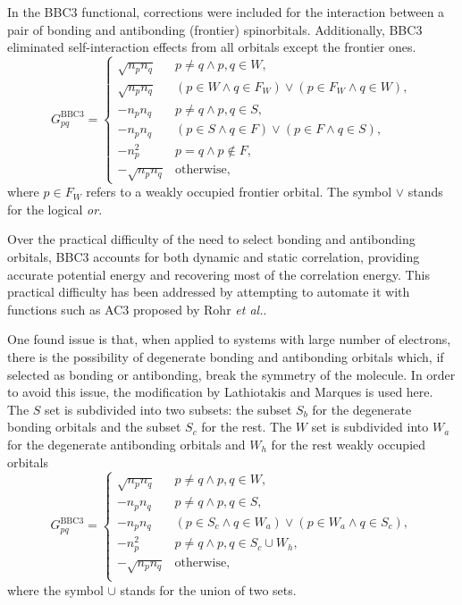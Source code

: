 In the BBC3 functional, corrections were included for the interaction between a pair 
of bonding and antibonding (frontier) spinorbitals.
Additionally, BBC3 eliminated self-interaction effects from all orbitals except
the frontier ones.
\begin{equation}
    G_{pq}^{\text{BBC3}} =
    \begin{cases}
        \sqrt{n_p n_q} &
        p\not=q \wedge p,q \in W,
        \\
        \sqrt{n_p n_q} &
        \left( p \in W \wedge q \in F_W \right) \vee
        \left( p \in F_W \wedge q \in W \right),
        \\
        -n_p n_q &
        p\not=q \wedge p,q \in S,
        \\
        -n_p n_q &
        \left( p \in S \wedge q \in F \right) \vee
        \left( p \in F \wedge q \in S \right),
        \\
        -n_p^{2} & p=q \wedge p\not\in F, \\
        - \sqrt{n_p n_q} & \text{otherwise},
    \end{cases}
\end{equation}
where $p \in F_W$ refers to a weakly occupied frontier orbital.
The symbol $\vee$ stands for the logical \textit{or}.

Over the practical difficulty of the need to select bonding and antibonding
orbitals, BBC3 accounts for both dynamic and static correlation, providing 
accurate potential energy and recovering most of the correlation energy. 
This practical difficulty has been addressed by attempting to automate it with
functions such as AC3 proposed by Rohr \textit{et al.}.

One found issue is that, when applied to systems with large number of
electrons, there is the possibility of degenerate bonding and antibonding
orbitals which, if selected as bonding or antibonding, break the symmetry
of the molecule.
In order to avoid this issue, the modification by Lathiotakis and 
Marques is used here.
The $S$ set is subdivided into
two subsets: the subset $S_b$ for the degenerate bonding orbitals and the subset
$S_c$ for the rest. The $W$ set is subdivided into $W_a$ for the degenerate
antibonding orbitals and $W_h$ for the rest weakly occupied orbitals
\begin{equation}
    G_{pq}^{\text{BBC3}} = 
    \begin{cases}
        \sqrt{n_p n_q} & p \not= q \wedge p,q \in W, \\
        -n_p n_q & p \not= q \wedge p,q \in S, \\
        -n_p n_q & \left( p \in S_c \wedge q \in W_a \right) \vee \left( p \in W_a \wedge q \in S_c \right), \\
        -n_p^{2} & p \not= q \wedge p,q \in S_c \cup W_h, \\
        -\sqrt{n_p n_q} & \text{otherwise}, \\
    \end{cases}
\end{equation}
where the symbol $\cup$ stands for the union of two sets.

